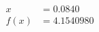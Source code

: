 \documentclass[preview]{standalone}
\begin{document}
\begin{align*}
x &= 0.0840\\f(x) &= 4.1540980
\end{align*}
\end{document}
